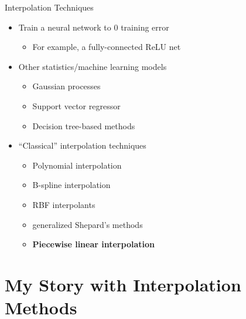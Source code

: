\documentclass[aspectratio=169]{beamer}
\begin{document}
\begin{frame}{Interpolation Techniques}

\begin{itemize}
\pause \item Train a neural network to 0 training error
\begin{itemize}
\pause \item For example, a fully-connected ReLU net
\end{itemize}
\bigskip
\pause \item Other statistics/machine learning models
\begin{itemize}
\pause
\item Gaussian processes
\item Support vector regressor
\item Decision tree-based methods
\end{itemize}
\bigskip
\pause \item ``Classical'' interpolation techniques
\begin{itemize}
\pause \item Polynomial interpolation
\item B-spline interpolation
\item RBF interpolants
\item generalized Shepard's methods
\item {\bf Piecewise linear interpolation}
\end{itemize}
\end{itemize}
\end{frame}

\section{My Story with Interpolation Methods}
\end{document}
